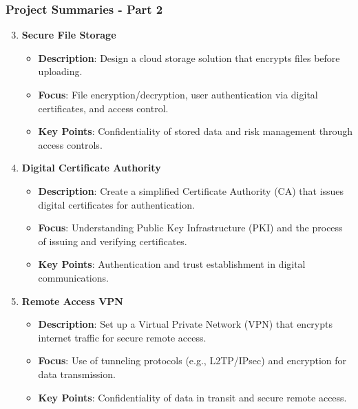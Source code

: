 \documentclass{beamer}
\begin{document}
\begin{frame}[fragile]
    \frametitle{Project Summaries - Part 2}
    \begin{enumerate}
        \setcounter{enumi}{2} %
        \item \textbf{Secure File Storage}
        \begin{itemize}
            \item \textbf{Description}: Design a cloud storage solution that encrypts files before uploading.
            \item \textbf{Focus}: File encryption/decryption, user authentication via digital certificates, and access control.
            \item \textbf{Key Points}: Confidentiality of stored data and risk management through access controls.
        \end{itemize}
        
        \item \textbf{Digital Certificate Authority}
        \begin{itemize}
            \item \textbf{Description}: Create a simplified Certificate Authority (CA) that issues digital certificates for authentication.
            \item \textbf{Focus}: Understanding Public Key Infrastructure (PKI) and the process of issuing and verifying certificates.
            \item \textbf{Key Points}: Authentication and trust establishment in digital communications.
        \end{itemize}
        
        \item \textbf{Remote Access VPN}
        \begin{itemize}
            \item \textbf{Description}: Set up a Virtual Private Network (VPN) that encrypts internet traffic for secure remote access.
            \item \textbf{Focus}: Use of tunneling protocols (e.g., L2TP/IPsec) and encryption for data transmission.
            \item \textbf{Key Points}: Confidentiality of data in transit and secure remote access.
        \end{itemize}
    \end{enumerate}
\end{frame}
\end{document}
